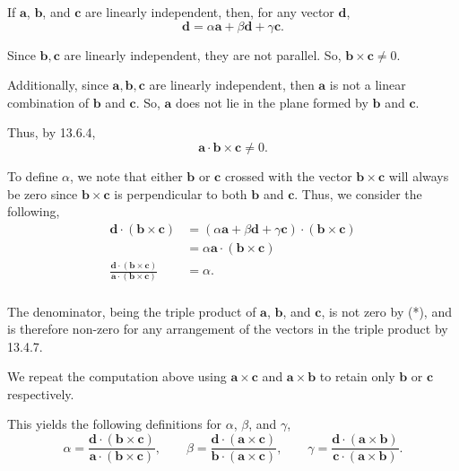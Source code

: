 \documentclass[../hw9]{subfiles}
\begin{document}
If $\mathbf{a}$, $\mathbf{b}$, and $\mathbf{c}$ are linearly independent, then, for any vector $\mathbf{d}$,
\[\mathbf{d}=\alpha \mathbf{a}+\beta \mathbf{d}+\gamma \mathbf{c}.\]

Since $\mathbf{b},\mathbf{c}$ are linearly independent, they are not parallel. So, $\mathbf{b}\times \mathbf{c}\neq0$.

Additionally, since $\mathbf{a},\mathbf{b},\mathbf{c}$ are linearly independent, then $\mathbf{a}$ is not a linear combination of $\mathbf{b}$ and $\mathbf{c}$. So, $\mathbf{a}$ does not lie in the plane formed by $\mathbf{b}$ and $\mathbf{c}$. 

Thus, by 13.6.4, \[\mathbf{a}\cdot \mathbf{b}\times \mathbf{c}\neq0.\tag{*}\]

To define $\alpha$, we note that either $\mathbf{b}$ or $\mathbf{c}$ crossed with the vector $\mathbf{b}\times \mathbf{c}$ will always be zero since $\mathbf{b}\times \mathbf{c}$ is perpendicular to both $\mathbf{b}$ and $\mathbf{c}$.
Thus, we consider the following,
\begin{align*}
    \mathbf{d}\cdot(\mathbf{b}\times \mathbf{c})&=(\alpha \mathbf{a}+\beta \mathbf{d}+\gamma \mathbf{c})\cdot(\mathbf{b}\times \mathbf{c})\\
    &=\alpha \mathbf{a}\cdot(\mathbf{b} \times \mathbf{c})\\
    \frac{\mathbf{d}\cdot(\mathbf{b} \times \mathbf{c})}{\mathbf{a}\cdot(\mathbf{b} \times \mathbf{c})}&=\alpha.\\
\end{align*}

The denominator, being the triple product of $\mathbf{a}$, $\mathbf{b}$, and $\mathbf{c}$, is not zero by (*), and is therefore non-zero for any arrangement of the vectors in the triple product by 13.4.7.

We repeat the computation above using $\mathbf{a}\times \mathbf{c}$ and $\mathbf{a}\times \mathbf{b}$ to retain only $\mathbf{b}$ or $\mathbf{c}$ respectively.

This yields the following definitions for $\alpha$, $\beta$, and $\gamma$,
\[
    \alpha=\frac{\mathbf{d}\cdot(\mathbf{b} \times \mathbf{c})}{\mathbf{a}\cdot(\mathbf{b} \times \mathbf{c})}, \qquad
    \beta=\frac{\mathbf{d}\cdot(\mathbf{a}\times \mathbf{c})}{\mathbf{b}\cdot(\mathbf{a}\times \mathbf{c})}, \qquad
    \gamma=\frac{\mathbf{d}\cdot(\mathbf{a}\times \mathbf{b})}{\mathbf{c}\cdot(\mathbf{a}\times \mathbf{b})}.
\]
\end{document}
